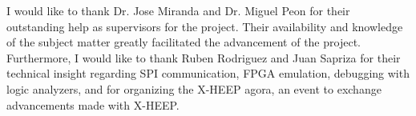 I would like to thank Dr. Jose Miranda and Dr. Miguel Peon for their outstanding help as supervisors for the project. Their availability and knowledge of the subject matter greatly facilitated the advancement of the project. Furthermore, I would like to thank Ruben Rodriguez and Juan Sapriza for their technical insight regarding SPI communication, FPGA emulation, debugging with logic analyzers, and for organizing the X-HEEP agora, an event to exchange advancements made with X-HEEP.





